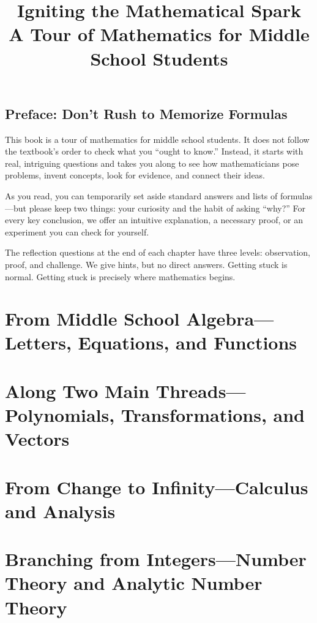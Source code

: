 \documentclass[11pt,openany,fontset=none]{ctexbook}
\title{\sffamily\bfseries Igniting the Mathematical Spark\\[2mm] {\large A Tour of Mathematics for Middle School Students}}
\author{}
\date{}
\theoremstyle{definition}
\theoremstyle{plain}
\theoremstyle{remark}
\begin{document}
\frontmatter
\maketitle
\tableofcontents

\chapter*{Preface: Don't Rush to Memorize Formulas}
This book is a tour of mathematics for middle school students. It does not follow the textbook's order to check what you ``ought to know.'' Instead, it starts with real, intriguing questions and takes you along to see how mathematicians pose problems, invent concepts, look for evidence, and connect their ideas.

As you read, you can temporarily set aside standard answers and lists of formulas---but please keep two things: your curiosity and the habit of asking ``why?'' For every key conclusion, we offer an intuitive explanation, a necessary proof, or an experiment you can check for yourself.

The reflection questions at the end of each chapter have three levels: observation, proof, and challenge. We give hints, but no direct answers. Getting stuck is normal. Getting stuck is precisely where mathematics begins.

\mainmatter

\part{From Middle School Algebra---Letters, Equations, and Functions}





\part{Along Two Main Threads---Polynomials, Transformations, and Vectors}





\part{From Change to Infinity---Calculus and Analysis}





\part{Branching from Integers---Number Theory and Analytic Number Theory}



\end{document}
